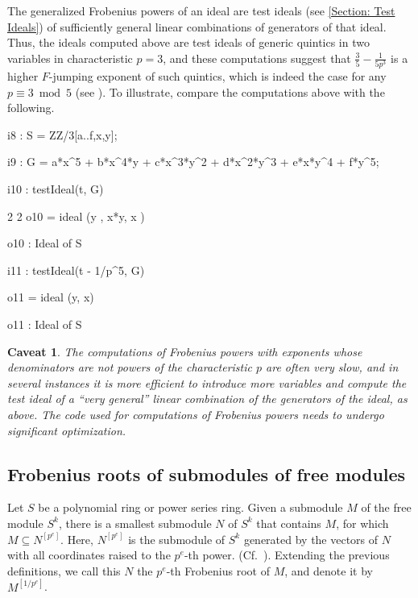 \documentclass{amsart}
\newtheorem*{caveat}{Caveat}
\begin{document}
The generalized Frobenius powers of an ideal are test ideals (see \autoref{Section: Test Ideals}) of sufficiently general linear combinations of generators of that ideal.
Thus, the ideals computed above are test ideals of generic quintics in two variables in characteristic $p=3$, and these computations suggest that $\frac35-\frac1{5p^3}$ is a higher $F$-jumping exponent of such quintics, which is indeed the case for any $p\equiv 3 \bmod 5$ (see \cite{hernandez+etal.frobenius_examples}).
To illustrate, compare the computations above with the following.

\medskip
{\small
\begin{MyVerbatim}
i8 : S = ZZ/3[a..f,x,y];

i9 : G = a*x^5 + b*x^4*y + c*x^3*y^2 + d*x^2*y^3 + e*x*y^4 + f*y^5;

i10 : testIdeal(t, G)

              2        2
o10 = ideal (y , x*y, x )

o10 : Ideal of S

i11 : testIdeal(t - 1/p^5, G)

o11 = ideal (y, x)

o11 : Ideal of S
\end{MyVerbatim}
}
\medskip

\begin{caveat}
   The computations of Frobenius powers with exponents whose denominators are not powers of the characteristic $p$ are often very slow, and in several instances it is more efficient to introduce more variables and compute the test ideal of a ``very general'' linear combination of the generators of the ideal, as above.
   The code used for computations of Frobenius powers needs to undergo significant optimization.
\end{caveat}

\subsection{Frobenius  roots of submodules of free modules}

Let $S$ be a polynomial ring or power series ring.
Given a submodule $M$ of the free module $S^k$,
%
%
there is a smallest submodule $N$ of $S^k$ that contains $M$, for which $M\subseteq N^{[p^e]}$.
Here,  $N^{[p^e]}$ is the submodule  of $S^k$ generated by the vectors of $N$ with all coordinates raised to the $p^e$-th power. (Cf.~\cite{KatzmanZhangAlgorithm}).
Extending the previous definitions,
we call this $N$ the $p^e$-th Frobenius root of $M$, and denote it by $M^{[1/p^e]}$.
\end{document}
